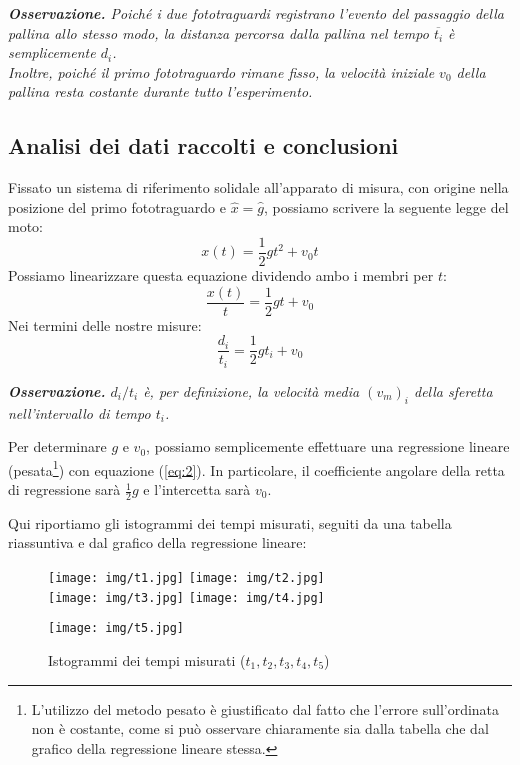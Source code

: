 \documentclass{article}
\begin{document}
\emph{
    \textbf{Osservazione.} Poiché i due fototraguardi registrano l'evento
    del passaggio della pallina allo stesso modo, la distanza percorsa dalla
    pallina nel tempo $\overline{t_i}$ è semplicemente $d_i$.\\
    Inoltre, poiché il primo fototraguardo rimane fisso, la velocità iniziale
    $v_0$ della pallina resta costante durante tutto l'esperimento.
}

\subsection{Analisi dei dati raccolti e conclusioni}
Fissato un sistema di riferimento solidale all'apparato di misura, con origine
nella posizione del primo fototraguardo e $\hat{x}=\hat{g}$, possiamo scrivere
la seguente legge del moto:
\[x(t) = \frac{1}{2} g t^2 + v_0 t\]
Possiamo linearizzare questa equazione dividendo ambo i membri per $t$:
\[\frac{x(t)}{t} = \frac{1}{2} g t + v_0\]
Nei termini delle nostre misure:
\begin{equation}\label{eq:2}
    \frac{d_i}{t_i} = \frac{1}{2} g t_i + v_0
\end{equation}

\emph{
    \textbf{Osservazione.} $d_i/t_i$ è, per definizione, la velocità
    media $\left(v_m\right)_i$ della sferetta nell'intervallo di tempo $t_i$.
}

Per determinare $g$ e $v_0$, possiamo semplicemente effettuare una regressione
lineare (pesata\footnote{
    L'utilizzo del metodo pesato è giustificato dal fatto che l'errore
    sull'ordinata non è costante, come si può osservare chiaramente sia
    dalla tabella che dal grafico della regressione lineare stessa.
}) con equazione (\ref{eq:2}). In particolare, il coefficiente angolare della
retta di regressione sarà $\frac{1}{2} g$ e l'intercetta sarà $v_0$.

Qui riportiamo gli istogrammi dei tempi misurati, seguiti da una tabella
riassuntiva e dal grafico della regressione lineare:

\begin{figure}[H]
    \texttt{[image: img/t1.jpg]}
    \texttt{[image: img/t2.jpg]}
    \\
    \texttt{[image: img/t3.jpg]}
    \texttt{[image: img/t4.jpg]}
\end{figure}
\begin{figure}[H]
    \vspace{-.6cm}
    \centering
    \texttt{[image: img/t5.jpg]}
    \caption{Istogrammi dei tempi misurati ($t_1,t_2,t_3,t_4,t_5$)}
\end{figure}
\end{document}
